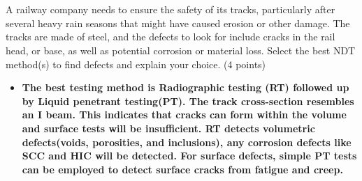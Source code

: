 \documentclass[11pt]{article}
\begin{document}
\section{}
A railway company needs to ensure the safety of its tracks, particularly after several heavy rain seasons that might have caused erosion or other damage. The tracks are made of steel, and the defects to look for include cracks in the rail head, or base, as well as potential corrosion or material loss. Select the best NDT method(s) to find defects and explain your choice. (4 points)
\begin{itemize}
    \item \textbf{The best testing method is Radiographic testing (RT) followed up by Liquid penetrant testing(PT). The track cross-section resembles an I beam. 
    This indicates that cracks can form within the volume and surface tests will be insufficient. 
    RT detects volumetric defects(voids, porosities, and inclusions), any corrosion defects like SCC and HIC will be detected. 
    For surface defects, simple PT tests can be employed to detect surface cracks from fatigue and creep.}
\end{itemize}
\end{document}
